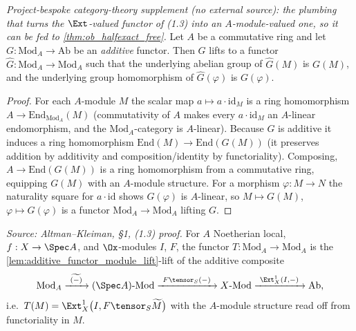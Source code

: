 \begin{lemma}

  \label{lem:additive_functor_module_lift}
  \textit{Project-bespoke category-theory supplement (no external source): the
  plumbing that turns the $\Ext$-valued functor of (1.3) into an
  $A$-module-valued one, so it can be fed to \cref{thm:ob_halfexact_free}.}
  Let $A$ be a commutative ring and let $G : \mathrm{Mod}_A \to \mathrm{Ab}$ be an
  \emph{additive} functor. Then $G$ lifts to a functor $\widehat G :
  \mathrm{Mod}_A \to \mathrm{Mod}_A$ such that the underlying abelian group of
  $\widehat G(M)$ is $G(M)$, and the underlying group homomorphism of $\widehat
  G(\varphi)$ is $G(\varphi)$.
  \begin{proof}
    For each $A$-module $M$ the scalar map $a \mapsto a\cdot\mathrm{id}_M$ is a ring
    homomorphism $A \to \mathrm{End}_{\mathrm{Mod}_A}(M)$ (commutativity of $A$
    makes every $a\cdot\mathrm{id}_M$ an $A$-linear endomorphism, and the
    $\mathrm{Mod}_A$-category is $A$-linear). Because $G$ is additive it induces a
    ring homomorphism $\mathrm{End}(M) \to \mathrm{End}(G(M))$ (it preserves
    addition by additivity and composition/identity by functoriality). Composing,
    $A \to \mathrm{End}(G(M))$ is a ring homomorphism from a commutative ring,
    equipping $G(M)$ with an $A$-module structure. For a morphism $\varphi : M \to
    N$ the naturality square for $a\cdot\mathrm{id}$ shows $G(\varphi)$ is
    $A$-linear, so $M \mapsto G(M)$, $\varphi \mapsto G(\varphi)$ is a functor
    $\mathrm{Mod}_A \to \mathrm{Mod}_A$ lifting $G$.
  \end{proof}
\end{lemma}

\begin{definition}

\leanok
[The functor $T(M) = \Ext^1_X(I, F\tensor_S\widetilde M)$]
  \label{def:functorT}
  \textit{Source: Altman--Kleiman, §1, (1.3) proof.}
  For $A$ Noetherian local, $f : X \to \Spec A$, and $\Ox$-modules $I$, $F$, the
  functor $T : \mathrm{Mod}_A \to \mathrm{Mod}_A$ is the
  \cref{lem:additive_functor_module_lift}-lift of the additive composite
  \[
    \mathrm{Mod}_A \xrightarrow{\ \widetilde{(-)}\ } (\Spec A)\text{-Mod}
      \xrightarrow{\ F\tensor_S(-)\ } X\text{-Mod}
      \xrightarrow{\ \Ext^1_X(I,-)\ } \mathrm{Ab},
  \]
  i.e.\ $T(M) = \Ext^1_X\bigl(I, F\tensor_S\widetilde M\bigr)$ with the $A$-module
  structure read off from functoriality in $M$.
\end{definition}


